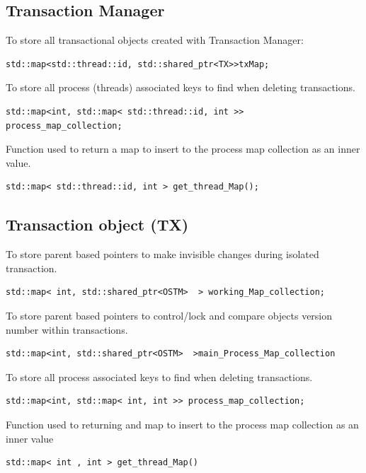 \documentclass[12pt]{article}
\begin{document}
\subsection{Transaction Manager}
To store all transactional objects created with Transaction Manager:
\begin{lstlisting}
std::map<std::thread::id, std::shared_ptr<TX>>txMap;
\end{lstlisting}
To store all process (threads) associated keys to find when deleting transactions. 
\begin{lstlisting}
std::map<int, std::map< std::thread::id, int >> process_map_collection;
\end{lstlisting}
Function used to return a map to insert to the process map collection as an inner value.
\begin{lstlisting}
std::map< std::thread::id, int > get_thread_Map();
\end{lstlisting}
\subsection{Transaction object (TX)}
To store parent based pointers to make invisible changes during isolated transaction.
\begin{lstlisting}
std::map< int, std::shared_ptr<OSTM>  > working_Map_collection;
\end{lstlisting}
To store parent based pointers to control/lock and compare objects version number within transactions.
\begin{lstlisting}
std::map<int, std::shared_ptr<OSTM>  >main_Process_Map_collection
\end{lstlisting}
To store all process associated keys to find when deleting transactions.
\begin{lstlisting}
std::map<int, std::map< int, int >> process_map_collection;
\end{lstlisting}
Function used to returning and map to insert to the process map collection as an inner value
\begin{lstlisting}
std::map< int , int > get_thread_Map()
\end{lstlisting}
\end{document}
